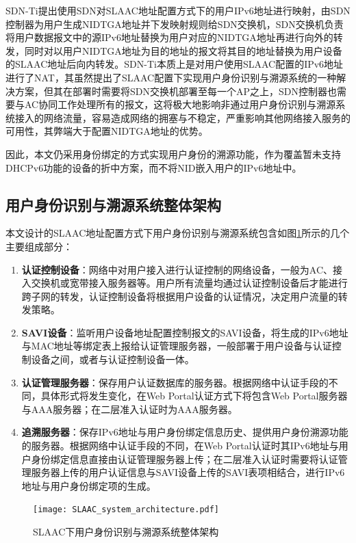   SDN-Ti\cite{SDNTi}提出使用SDN对SLAAC地址配置方式下的用户IPv6地址进行映射，由SDN控制器为用户生成NIDTGA地址并下发映射规则给SDN交换机，SDN交换机负责将用户数据报文中的源IPv6地址替换为用户对应的NIDTGA地址再进行向外的转发，同时对以用户NIDTGA地址为目的地址的报文将其目的地址替换为用户设备的SLAAC地址后向内转发。SDN-Ti本质上是对用户使用SLAAC配置的IPv6地址进行了NAT，其虽然提出了SLAAC配置下实现用户身份识别与溯源系统的一种解决方案，但其在部署时需要将SDN交换机部署至每一个AP之上，SDN控制器也需要与AC协同工作处理所有的报文，这将极大地影响非通过用户身份识别与溯源系统接入的网络流量，容易造成网络的拥塞与不稳定，严重影响其他网络接入服务的可用性，其弊端大于配置NIDTGA地址的优势。

  因此，本文仍采用身份绑定的方式实现用户身份的溯源功能，作为覆盖暂未支持DHCPv6功能的设备的折中方案，而不将NID嵌入用户的IPv6地址中。

    \subsection{用户身份识别与溯源系统整体架构}
    \label{NIDTGA:SLAAC:architecture}
    本文设计的SLAAC地址配置方式下用户身份识别与溯源系统包含如图\ref{fig:SLAAC_system_architecture}所示的几个主要组成部分：
    \begin{enumerate}[1{)}]
      \item \textbf{认证控制设备}：网络中对用户接入进行认证控制的网络设备，一般为AC、接入交换机或宽带接入服务器等。用户所有流量均通过认证控制设备后才能进行跨子网的转发，认证控制设备将根据用户设备的认证情况，决定用户流量的转发策略。
      \item \textbf{SAVI设备}：监听用户设备地址配置控制报文的SAVI设备，将生成的IPv6地址与MAC地址等绑定表上报给认证管理服务器，一般部署于用户设备与认证控制设备之间，或者与认证控制设备一体。
      \item \textbf{认证管理服务器}：保存用户认证数据库的服务器。根据网络中认证手段的不同，具体形式将发生变化，在Web Portal认证方式下将包含Web Portal服务器与AAA服务器；在二层准入认证时为AAA服务器。
      \item \textbf{追溯服务器}：保存IPv6地址与用户身份绑定信息历史、提供用户身份溯源功能的服务器。根据网络中认证手段的不同，在Web Portal认证时其IPv6地址与用户身份绑定信息直接由认证管理服务器上传；在二层准入认证时需要将认证管理服务器上传的用户认证信息与SAVI设备上传的SAVI表项相结合，进行IPv6地址与用户身份绑定项的生成。
    \end{enumerate}

    \begin{figure}[ht]
      \centering
      \texttt{[image: SLAAC\_system\_architecture.pdf]}
      \caption{SLAAC下用户身份识别与溯源系统整体架构}
      \label{fig:SLAAC_system_architecture}
    \end{figure}


